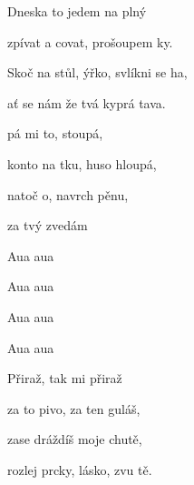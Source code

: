 

\zr
Dneska to jedem na plný 

zpívat a covat, prošoupem ky.

Skoč na stůl, ýřko, svlíkni se ha,

ať se nám že tvá kyprá tava.
\kr


\zs
{}pá mi to, stoupá,

konto na tku, huso hloupá,

natoč o, navrch pěnu,

za tvý  zvedám 
\ks

\zr \kr

\zr
Aua aua

Aua aua



Aua aua

Aua aua
\kr


\zs
Přiraž, tak mi přiraž

za to pivo, za ten guláš,

zase dráždíš moje chutě,

rozlej prcky, lásko, zvu tě.
\ks


\zr \kr
\zr \kr

\kp
